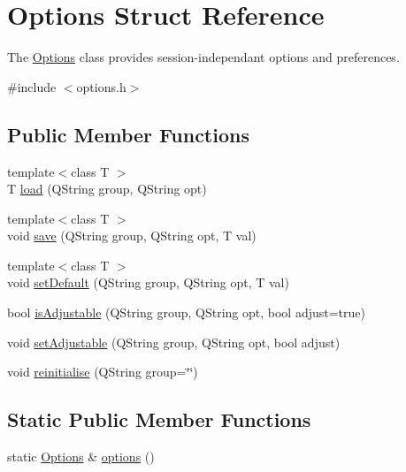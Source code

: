 \hypertarget{struct_options}{\section{\-Options \-Struct \-Reference}
\label{struct_options}
}


\-The \hyperlink{struct_options}{\-Options} class provides session-\/independant options and preferences.  




{\ttfamily \#include $<$options.\-h$>$}

\subsection*{\-Public \-Member \-Functions}
\begin{DoxyCompactItemize}
\item 
{\footnotesize template$<$class T $>$ }\\\-T \hyperlink{struct_options_ada32d485296bd6ba73a1d95bd6260c1a}{load} (\-Q\-String group, \-Q\-String opt)
\item 
{\footnotesize template$<$class T $>$ }\\void \hyperlink{struct_options_ad20146ff9544f6229bb1696ea5bf643d}{save} (\-Q\-String group, \-Q\-String opt, \-T val)
\item 
{\footnotesize template$<$class T $>$ }\\void \hyperlink{struct_options_ab1d167bd93bce7dd453fcbb93acf12e4}{set\-Default} (\-Q\-String group, \-Q\-String opt, \-T val)
\item 
bool \hyperlink{struct_options_a1188a188db82d70c96af44679d2cbbf9}{is\-Adjustable} (\-Q\-String group, \-Q\-String opt, bool adjust=true)
\item 
void \hyperlink{struct_options_a086db8fe7688ddcb3b74db85262a5ba0}{set\-Adjustable} (\-Q\-String group, \-Q\-String opt, bool adjust)
\item 
void \hyperlink{struct_options_a336da0a8bbd1b849a1783bb110904d9f}{reinitialise} (\-Q\-String group=\char`\"{}\char`\"{})
\end{DoxyCompactItemize}
\subsection*{\-Static \-Public \-Member \-Functions}
\begin{DoxyCompactItemize}
\item 
static \hyperlink{struct_options}{\-Options} \& \hyperlink{struct_options_aa3dd7609fbc5d54af65992632bff842a}{options} ()
\end{DoxyCompactItemize}


